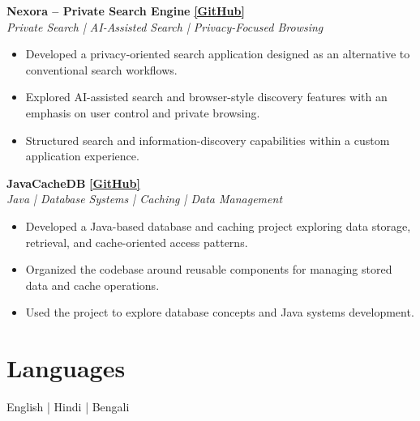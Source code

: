 \documentclass[10pt,a4paper]{article}
\newcommand{\resumeProject}[3]{
    \textbf{#1}
    \hfill
    \href{#3}{\textbf{[GitHub]}}
    \\
    \textit{#2}
    \vspace{1pt}
}
\newcommand{\resumeProjectEnd}{
    \vspace{3pt}
}
\begin{document}
\resumeProject
{Nexora -- Private Search Engine}
{Private Search | AI-Assisted Search | Privacy-Focused Browsing}
{https://github.com/BijoySarkar19/nexora-private-search}

\begin{itemize}[leftmargin=14pt, itemsep=1pt, topsep=1pt]
    \item Developed a privacy-oriented search application designed as an alternative to conventional search workflows.
    \item Explored AI-assisted search and browser-style discovery features with an emphasis on user control and private browsing.
    \item Structured search and information-discovery capabilities within a custom application experience.
\end{itemize}
\resumeProjectEnd

\resumeProject
{JavaCacheDB}
{Java | Database Systems | Caching | Data Management}
{https://github.com/BijoySarkar19/JavaCacheDB}

\begin{itemize}[leftmargin=14pt, itemsep=1pt, topsep=1pt]
    \item Developed a Java-based database and caching project exploring data storage, retrieval, and cache-oriented access patterns.
    \item Organized the codebase around reusable components for managing stored data and cache operations.
    \item Used the project to explore database concepts and Java systems development.
\end{itemize}
\resumeProjectEnd


\section{Languages}

English \hspace{15pt} | \hspace{15pt}
Hindi \hspace{15pt} | \hspace{15pt}
Bengali

\end{document}
